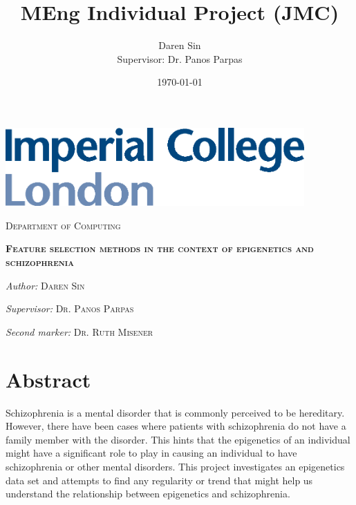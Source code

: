\documentclass[12pt, twoside, a4paper]{report}
\title{MEng Individual Project (JMC)}
\author{Daren Sin \\  Supervisor: Dr. Panos Parpas}
\date{\today}
\newcommand\blankpage{%
    \null
    \thispagestyle{empty}%
    \addtocounter{page}{-1}%
    \newpage}
\begin{document}
\begin{titlingpage}

\vspace*{1.5cm}

\begin{center}
\includegraphics[height=3cm]{images/imperial}
\end{center}

\vspace{1.5cm}
\begin{center}
\Large

\textsc{Department of Computing}
\end{center}

\vspace{2cm}

\begin{center}
\Large \textsc{\thetitle}

\vspace{2cm}

\textsc{\textbf{Feature selection methods in the context of epigenetics and schizophrenia}}

\end{center}

\vspace{2cm}

\begin{center}
\large \textit{Author:} \textsc{Daren Sin}

\textit{Supervisor:} \textsc{Dr. Panos Parpas}

\textit{Second marker:} \textsc{Dr. Ruth Misener}
\end{center}

\vspace{2cm}

\begin{center}
\normalsize \textsc{\thedate}
\end{center}

\end{titlingpage}


\afterpage{\blankpage}

\singlespacing
\chapter*{Abstract}
Schizophrenia is a mental disorder that is commonly perceived to be hereditary. However, there have been cases where patients with schizophrenia do not have a family member with the disorder. This hints that the epigenetics of an individual might have a significant role to play in causing an individual to have schizophrenia or other mental disorders. This project investigates an epigenetics data set and attempts to find any regularity or trend that might help us understand the relationship between epigenetics and schizophrenia.
\end{document}
